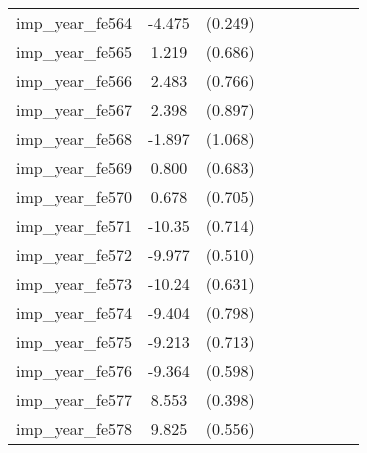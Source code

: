 {\begin{tabular}{l*{4}{cc}}
imp\_year\_fe564&   -4.475\sym{***}&  (0.249)&                  &         &                  &         &                  &         \\
imp\_year\_fe565&    1.219         &  (0.686)&                  &         &                  &         &                  &         \\
imp\_year\_fe566&    2.483\sym{**} &  (0.766)&                  &         &                  &         &                  &         \\
imp\_year\_fe567&    2.398\sym{**} &  (0.897)&                  &         &                  &         &                  &         \\
imp\_year\_fe568&   -1.897         &  (1.068)&                  &         &                  &         &                  &         \\
imp\_year\_fe569&    0.800         &  (0.683)&                  &         &                  &         &                  &         \\
imp\_year\_fe570&    0.678         &  (0.705)&                  &         &                  &         &                  &         \\
imp\_year\_fe571&   -10.35\sym{***}&  (0.714)&                  &         &                  &         &                  &         \\
imp\_year\_fe572&   -9.977\sym{***}&  (0.510)&                  &         &                  &         &                  &         \\
imp\_year\_fe573&   -10.24\sym{***}&  (0.631)&                  &         &                  &         &                  &         \\
imp\_year\_fe574&   -9.404\sym{***}&  (0.798)&                  &         &                  &         &                  &         \\
imp\_year\_fe575&   -9.213\sym{***}&  (0.713)&                  &         &                  &         &                  &         \\
imp\_year\_fe576&   -9.364\sym{***}&  (0.598)&                  &         &                  &         &                  &         \\
imp\_year\_fe577&    8.553\sym{***}&  (0.398)&                  &         &                  &         &                  &         \\
imp\_year\_fe578&    9.825\sym{***}&  (0.556)&                  &         &                  &         &                  &         \\

\end{tabular}}
